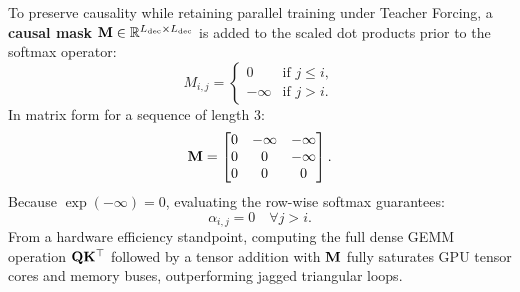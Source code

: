 \documentclass[../../main.tex]{subfiles}
\begin{document}
To preserve causality while retaining parallel training under Teacher Forcing, a \textbf{causal mask} $\mathbf{M} \in \mathbb{R}^{L_{\text{dec}} \times L_{\text{dec}}}$ is added to the scaled dot products prior to the softmax operator:
\begin{equation}
\label{eq:causal_mask_definition}
M_{i, j} = \begin{cases}
0 & \text{if } j \le i, \\
-\infty & \text{if } j > i.
\end{cases}
\end{equation}
In matrix form for a sequence of length 3:
\begin{equation}
\mathbf{M} = \begin{bmatrix}
0 & -\infty & -\infty \\
0 & 0 & -\infty \\
0 & 0 & 0
\end{bmatrix}.
\end{equation}
Because $\exp(-\infty) = 0$, evaluating the row-wise softmax guarantees:
\begin{equation}
\alpha_{i, j} = 0 \quad \forall j > i.
\end{equation}
From a hardware efficiency standpoint, computing the full dense GEMM operation $\mathbf{Q} \mathbf{K}^\top$ followed by a tensor addition with $\mathbf{M}$ fully saturates GPU tensor cores and memory buses, outperforming jagged triangular loops.
\end{document}
